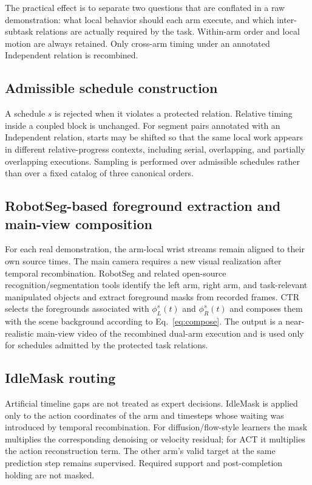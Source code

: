 The practical effect is to separate two questions that are conflated in a raw demonstration: what local behavior should each arm execute, and which inter-subtask relations are actually required by the task. Within-arm order and local motion are always retained. Only cross-arm timing under an annotated Independent relation is recombined.

\subsection{Admissible schedule construction}
A schedule $s$ is rejected when it violates a protected relation. Relative timing inside a coupled block is unchanged. For segment pairs annotated with an Independent relation, starts may be shifted so that the same local work appears in different relative-progress contexts, including serial, overlapping, and partially overlapping executions. Sampling is performed over admissible schedules rather than over a fixed catalog of three canonical orders.

\subsection{RobotSeg-based foreground extraction and main-view composition}
For each real demonstration, the arm-local wrist streams remain aligned to their own source times. The main camera requires a new visual realization after temporal recombination. RobotSeg and related open-source recognition/segmentation tools identify the left arm, right arm, and task-relevant manipulated objects and extract foreground masks from recorded frames. CTR selects the foregrounds associated with $\phi_L^s(t)$ and $\phi_R^s(t)$ and composes them with the scene background according to Eq.~\ref{eq:compose}. The output is a near-realistic main-view video of the recombined dual-arm execution and is used only for schedules admitted by the protected task relations.

\subsection{IdleMask routing}
Artificial timeline gaps are not treated as expert decisions. IdleMask is applied only to the action coordinates of the arm and timesteps whose waiting was introduced by temporal recombination. For diffusion/flow-style learners the mask multiplies the corresponding denoising or velocity residual; for ACT it multiplies the action reconstruction term. The other arm's valid target at the same prediction step remains supervised. Required support and post-completion holding are not masked.


